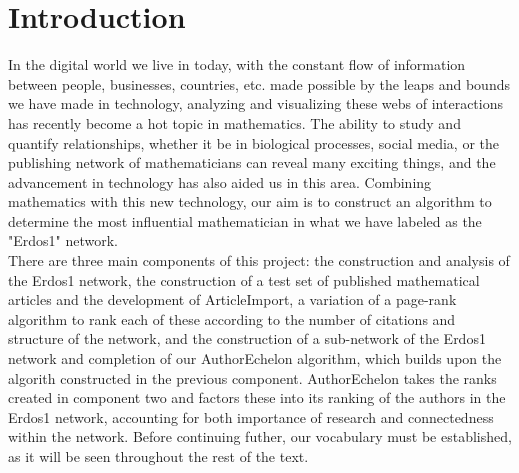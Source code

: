 \documentclass[14pt]{article} %
\begin{document}
\section{Introduction}
\indent In the digital world we live in today, with the constant flow of information between people, businesses, countries, etc. made possible by the leaps and bounds we have made in technology, analyzing and visualizing these webs of interactions has recently become a hot topic in mathematics. The ability to study and quantify relationships, whether it be in biological processes, social media, or the publishing network of mathematicians can reveal many exciting things, and the advancement in technology has also aided us in this area. Combining mathematics with this new technology, our aim is to construct an algorithm to determine the most influential mathematician in what we have labeled as the "Erdos1" network. \\
\indent There are three main components of this project: the construction and analysis of the Erdos1 network, the construction of a test set of published mathematical articles and the development of ArticleImport, a variation of a page-rank algorithm to rank each of these according to the number of citations and structure of the network, and the construction of a sub-network of the Erdos1 network and completion of our AuthorEchelon algorithm, which builds upon the algorith constructed in the previous component. AuthorEchelon takes the ranks created in component two and factors these into its ranking of the authors in the Erdos1 network, accounting for both importance of research and connectedness within the network. Before continuing futher, our vocabulary must be established, as it will be seen throughout the rest of the text.\\
\\
\end{document}
